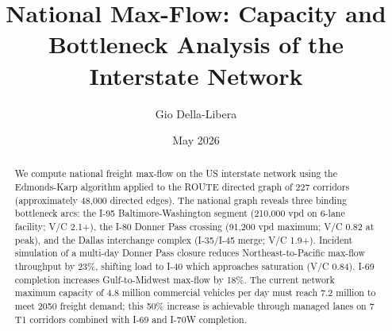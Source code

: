 \documentclass[12pt]{article}
\title{National Max-Flow: Capacity and Bottleneck Analysis of the Interstate Network}
\author{Gio Della-Libera}
\date{May 2026}
\begin{document}
\maketitle
\begin{abstract}
We compute national freight max-flow on the US interstate network using the Edmonds-Karp algorithm applied to the ROUTE directed graph of 227 corridors (approximately 48,000 directed edges). The national graph reveals three binding bottleneck arcs: the I-95 Baltimore-Washington segment (210,000 vpd on 6-lane facility; V/C 2.1+), the I-80 Donner Pass crossing (91,200 vpd maximum; V/C 0.82 at peak), and the Dallas interchange complex (I-35/I-45 merge; V/C 1.9+). Incident simulation of a multi-day Donner Pass closure reduces Northeast-to-Pacific max-flow throughput by 23\%, shifting load to I-40 which approaches saturation (V/C 0.84). I-69 completion increases Gulf-to-Midwest max-flow by 18\%. The current network maximum capacity of 4.8 million commercial vehicles per day must reach 7.2 million to meet 2050 freight demand; this 50\% increase is achievable through managed lanes on 7 T1 corridors combined with I-69 and I-70W completion.
\end{abstract}









\end{document}
